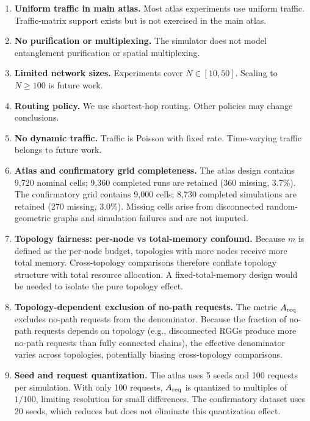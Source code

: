\documentclass[quantumrep,article,submit,moreauthors]{Definitions/mdpi}
\begin{document}
\begin{enumerate}[leftmargin=2em]
\item \textbf{Uniform traffic in main atlas.} Most atlas experiments use uniform traffic. Traffic-matrix support exists but is not exercised in the main atlas.

\item \textbf{No purification or multiplexing.} The simulator does not model entanglement purification or spatial multiplexing.

\item \textbf{Limited network sizes.} Experiments cover $N \in [10, 50]$. Scaling to $N \geq 100$ is future work.

\item \textbf{Routing policy.} We use shortest-hop routing. Other policies may change conclusions.

\item \textbf{No dynamic traffic.} Traffic is Poisson with fixed rate. Time-varying traffic belongs to future work.

\item \textbf{Atlas and confirmatory grid completeness.} The atlas design contains 9{,}720 nominal cells; 9{,}360 completed runs are retained (360 missing, 3.7\%). The confirmatory grid contains 9{,}000 cells; 8{,}730 completed simulations are retained (270 missing, 3.0\%). Missing cells arise from disconnected random-geometric graphs and simulation failures and are not imputed.

\item \textbf{Topology fairness: per-node vs total-memory confound.} Because $m$ is defined as the per-node budget, topologies with more nodes receive more total memory. Cross-topology comparisons therefore conflate topology structure with total resource allocation. A fixed-total-memory design would be needed to isolate the pure topology effect.

\item \textbf{Topology-dependent exclusion of no-path requests.} The metric $A_{\rm req}$ excludes no-path requests from the denominator. Because the fraction of no-path requests depends on topology (e.g., disconnected RGGs produce more no-path requests than fully connected chains), the effective denominator varies across topologies, potentially biasing cross-topology comparisons.

\item \textbf{Seed and request quantization.} The atlas uses 5 seeds and 100 requests per simulation. With only 100 requests, $A_{\rm req}$ is quantized to multiples of $1/100$, limiting resolution for small differences. The confirmatory dataset uses 20 seeds, which reduces but does not eliminate this quantization effect.


\end{enumerate}
\end{document}
